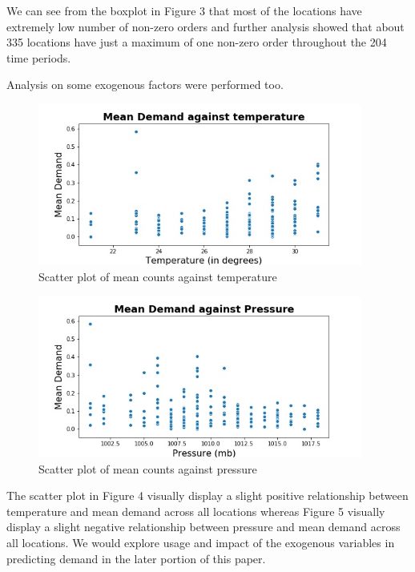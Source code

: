 \documentclass[12pt, letterpaper] {article}
\begin{document}
\noindent We can see from the boxplot in Figure 3 that most of the locations have extremely low number of non-zero orders and further analysis showed that about 335 locations have just a maximum of one non-zero order throughout the 204 time periods. 

\noindent Analysis on some exogenous factors were performed too. 
\begin{figure}[H]
    \centering
    \includegraphics[width=0.95\textwidth, height=0.32\textheight]{Images/temp_mean_demand.jpg}
    \caption{Scatter plot of mean counts against temperature}
    \label{fig:Scatter plot of mean counts against temperature}
\end{figure}

\begin{figure}[H]
    \centering
    \includegraphics[width=0.95\textwidth, height=0.32\textheight]{Images/pressure_mean_demand.jpg}
    \caption{Scatter plot of mean counts against pressure}
    \label{fig:Scatter plot of mean counts against pressure}
\end{figure}

\noindent The scatter plot in Figure 4 visually display a slight positive relationship between temperature and mean demand across all locations whereas Figure 5 visually display a slight negative relationship between pressure and mean demand across all locations. We would explore usage and impact of the exogenous variables in predicting demand in the later portion of this paper. 
\end{document}
